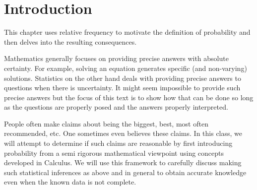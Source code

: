 \documentclass[10pt,]{book}
\theoremstyle{plain}
\theoremstyle{definition}
\theoremstyle{definition}
\theoremstyle{definition}
\numberwithin{equation}{section}
\begin{document}
\section[{Introduction}]{Introduction}\label{section-17}
This chapter uses relative frequency to motivate the definition of probability and then delves into the resulting consequences.%
\par
Mathematics generally focuses on providing precise answers with absolute certainty. For example, solving an equation generates specific (and non-varying) solutions. Statistics on the other hand deals with providing precise answers to questions when there is uncertainty. It might seem impossible to provide such precise answers but the focus of this text is to show how that can be done so long as the questions are properly posed and the answers properly interpreted.%
\par
People often make claims about being the biggest, best, most often recommended, etc. One sometimes even believes these claims. In this class, we will attempt to determine if such claims are reasonable by first introducing probability from a semi rigorous mathematical viewpoint using concepts developed in Calculus. We will use this framework to carefully discuss making such statistical inferences as above and in general to obtain accurate knowledge even when the known data is not complete. %
\typeout{************************************************}
\typeout{************************************************}
\end{document}
